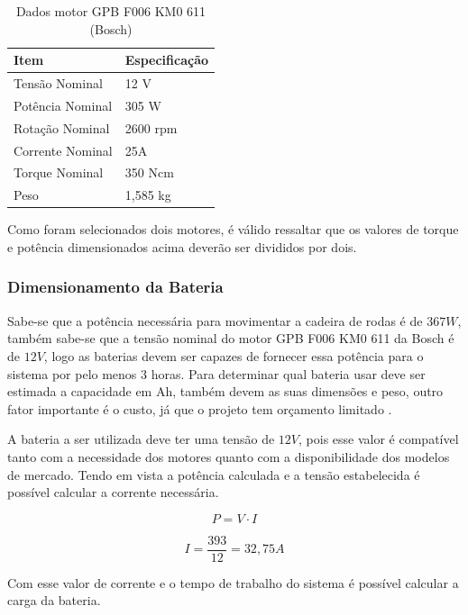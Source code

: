 \begin{table}[h]
\centering
\vspace{0.5cm}
\begin{tabular}{|l|l|}
\hline
Item                & Especificação \\
\hline
Tensão Nominal      & 12 V \\
Potência Nominal    & 305 W \\
Rotação Nominal     & 2600 rpm \\
Corrente Nominal    & 25A \\
Torque Nominal      & 350 Ncm \\
Peso                & 1,585 kg \\
\hline
\end{tabular}
\caption{Dados motor GPB F006 KM0 611 (Bosch)}
\label{tab:dadosmotor}
\end{table}

Como foram selecionados dois motores, é válido ressaltar 
que os valores de torque e potência dimensionados acima deverão ser divididos por dois.


\subsubsection{Dimensionamento da Bateria}

Sabe-se que a potência necessária para movimentar a cadeira de rodas é de $367 W$,
também sabe-se que a tensão nominal do motor GPB F006 KM0 611 da Bosch é de $12V$,
logo as baterias devem ser capazes de fornecer essa potência para o sistema por
pelo menos 3 horas. Para determinar qual bateria usar deve ser estimada a
capacidade em Ah, também devem as suas dimensões e peso, outro fator importante
é o custo, já que o projeto tem orçamento limitado \cite{costa}.

A bateria a ser utilizada deve ter uma tensão de $12V$, pois esse valor é
compatível tanto com a necessidade dos motores quanto com a disponibilidade dos
modelos de mercado. Tendo em vista a potência calculada e a tensão estabelecida
é possível calcular a corrente necessária.

\begin{equation}
P = V \cdot I
\end{equation}

\begin{equation}
I = \frac{393}{12} = 32,75 A
\end{equation}

Com esse valor de corrente e o tempo de trabalho do sistema é possível calcular
a carga da bateria.

